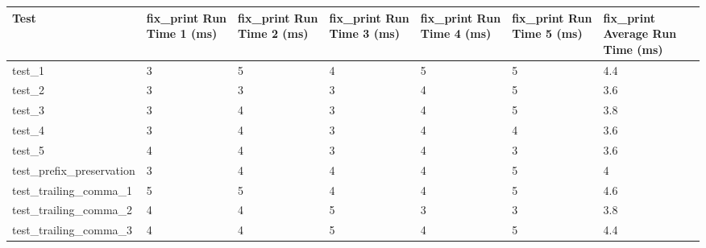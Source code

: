 \begin{table*}[ht]
    \centering
    \begin{tabular}{@{}l|p{5em}p{5em}p{5em}p{5em}p{5em}p{5em}@{}}
    \toprule
    Test                                  & fix\_print Run Time 1 (ms) & fix\_print Run Time 2 (ms) & fix\_print Run Time 3 (ms) & fix\_print Run Time 4 (ms) & fix\_print Run Time 5 (ms) & fix\_print Average Run Time (ms) \\ \midrule
    test\_1                               & 3                          & 5                          & 4                          & 5                          & 5                          & 4.4                              \\
    test\_2                               & 3                          & 3                          & 3                          & 4                          & 5                          & 3.6                              \\
    test\_3                               & 3                          & 4                          & 3                          & 4                          & 5                          & 3.8                              \\
    test\_4                               & 3                          & 4                          & 3                          & 4                          & 4                          & 3.6                              \\
    test\_5                               & 4                          & 4                          & 3                          & 4                          & 3                          & 3.6                              \\
    test\_prefix\_preservation            & 3                          & 4                          & 4                          & 4                          & 5                          & 4                                \\
    test\_trailing\_comma\_1              & 5                          & 5                          & 4                          & 4                          & 5                          & 4.6                              \\
    test\_trailing\_comma\_2              & 4                          & 4                          & 5                          & 3                          & 3                          & 3.8                              \\
    test\_trailing\_comma\_3              & 4                          & 4                          & 5                          & 4                          & 5                          & 4.4                              \\

\end{tabular}
\end{table*}
